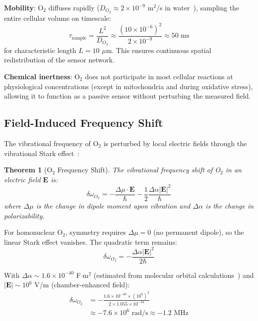 \documentclass[twocolumn,10pt,aps,prd,superscriptaddress,floatfix,nofootinbib]{revtex4-2}
\newtheorem{theorem}{Theorem}[section]
\theoremstyle{remark}
\begin{document}
\textbf{Mobility}: O$_2$ diffuses rapidly ($D_{O_2} \approx 2 \times 10^{-9}$ m$^2$/s in water~\cite{Subczynski1992}), sampling the entire cellular volume on timescale:
\begin{equation}
\tau_{\mathrm{sample}} = \frac{L^2}{D_{O_2}} \approx \frac{(10 \times 10^{-6})^2}{2 \times 10^{-9}} \approx 50 \text{ ms}
\end{equation}
for characteristic length $L = 10$ $\mu$m. This ensures continuous spatial redistribution of the sensor network.

\textbf{Chemical inertness}: O$_2$ does not participate in most cellular reactions at physiological concentrations (except in mitochondria and during oxidative stress), allowing it to function as a passive sensor without perturbing the measured field.

\subsection{Field-Induced Frequency Shift}

The vibrational frequency of O$_2$ is perturbed by local electric fields through the vibrational Stark effect~\cite{Boxer2009}:

\begin{theorem}[O$_2$ Frequency Shift]
\label{thm:O2_shift}
The vibrational frequency shift of O$_2$ in an electric field $\mathbf{E}$ is:
\begin{equation}
\delta\omega_{O_2} = -\frac{\Delta\mu \cdot \mathbf{E}}{\hbar} - \frac{1}{2}\frac{\Delta\alpha |\mathbf{E}|^2}{\hbar}
\label{eq:stark_shift}
\end{equation}
where $\Delta\mu$ is the change in dipole moment upon vibration and $\Delta\alpha$ is the change in polarizability.
\end{theorem}

For homonuclear O$_2$, symmetry requires $\Delta\mu = 0$ (no permanent dipole), so the linear Stark effect vanishes. The quadratic term remains:
\begin{equation}
\delta\omega_{O_2} = -\frac{\Delta\alpha |\mathbf{E}|^2}{2\hbar}
\label{eq:quadratic_stark}
\end{equation}

With $\Delta\alpha \sim 1.6 \times 10^{-40}$ F$\cdot$m$^2$ (estimated from molecular orbital calculations~\cite{Maroulis2000}) and $|\mathbf{E}| \sim 10^{6}$ V/m (chamber-enhanced field):
\begin{align}
\delta\omega_{O_2} &= -\frac{1.6 \times 10^{-40} \times (10^{6})^2}{2 \times 1.055 \times 10^{-34}} \nonumber \\
&\approx -7.6 \times 10^{6} \text{ rad/s} \approx -1.2 \text{ MHz}
\end{align}
\end{document}
